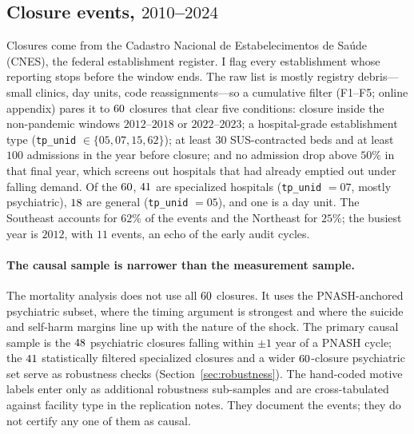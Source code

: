 \subsection{\texorpdfstring{Closure events, $2010$--$2024$}{Closure events, 2010--2024}}
\label{sec:setting-closures}

Closures come from the Cadastro Nacional de Estabelecimentos de Saúde
(CNES), the federal establishment register. I flag every establishment
whose reporting stops before the window ends. The raw list is mostly
registry debris---small clinics, day units, code reassignments---so a
cumulative filter (F1--F5; online appendix) pares it to
$60$ closures that clear five conditions: closure inside
the non-pandemic windows $2012$--$2018$ or $2022$--$2023$; a
hospital-grade establishment type (\texttt{tp\_unid} $\in
\{05, 07, 15, 62\}$); at least $30$ SUS-contracted beds and at least
$100$ admissions in the year before closure; and no admission drop above
$50\%$ in that final year, which screens out hospitals that had already
emptied out under falling demand. Of the $60$,
$41$ are specialized hospitals (\texttt{tp\_unid} $= 07$,
mostly psychiatric), $18$ are general (\texttt{tp\_unid} $=
05$), and one is a day unit. The Southeast accounts for $62\%$ of the
events and the Northeast for $25\%$; the busiest year is $2012$, with
$11$ events, an echo of the early audit cycles.

\paragraph{The causal sample is narrower than the measurement sample.}
The mortality analysis does not use all $60$ closures. It
uses the PNASH-anchored psychiatric subset, where the timing argument is
strongest and where the suicide and self-harm margins line up with the
nature of the shock. The primary causal sample is the
$48$ psychiatric closures falling within $\pm 1$ year of
a PNASH cycle; the $41$ statistically filtered specialized
closures and a wider $60$-closure psychiatric set serve
as robustness checks (Section~\ref{sec:robustness}). The hand-coded
motive labels enter only as additional robustness sub-samples and are
cross-tabulated against facility type in the replication notes. They
document the events; they do not certify any one of them as causal.

